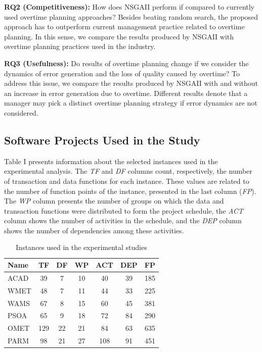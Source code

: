 \documentclass[conference]{IEEEtran}
\begin{document}
\vspace{3px}
\noindent
\textbf{RQ2 (Competitiveness):} How does NSGAII perform if compared to currently used overtime planning approaches? Besides beating random search, the proposed approach has to outperform current management practice related to overtime planning. In this sense, we compare the results produced by NSGAII with overtime planning practices used in the industry.

\vspace{3px}
\noindent
\textbf{RQ3 (Usefulness):} Do results of overtime planning change if we consider the dynamics of error generation and the loss of quality caused by overtime? To address this issue, we compare the results produced by NSGAII with and without an increase in error generation due to overtime. Different results denote that a manager may pick a distinct overtime planning strategy if error dynamics are not considered.

\subsection{Software Projects Used in the Study}

Table I presents information about the selected instances used in the experimental analysis. The {\it TF} and {\it DF} columns count, respectively, the number of transaction and data functions for each instance. These values are related to the number of function points of the instance, presented in the last column ({\it FP}). The {\it WP} column presents the number of groups on which the data and transaction functions were distributed to form the project schedule, the {\it ACT} column shows the number of activities in the schedule, and the {\it DEP} column shows the number of dependencies among these activities.

\begin{table}[htbp]
  \centering
  \caption{Instances used in the experimental studies}
    \begin{tabular}
		{lcccccc}
    \toprule
		Name & TF & DF & WP & ACT & DEP & FP \\
    \midrule
    ACAD  & 39    & 7     & 10    &  40  &  39  & 185 \\
    WMET  & 48    & 7     & 11    &  44  &  33  & 225 \\
    WAMS  & 67    & 8     & 15    &  60  &  45  & 381 \\
    PSOA  & 65    & 9     & 18    &  72  &  84  & 290 \\
    OMET  & 129   & 22    & 21    &  84  &  63  & 635 \\
    PARM  & 98    & 21    & 27    & 108  &  91  & 451 \\
    \bottomrule
    \end{tabular}%
\end{table}%
\end{document}
